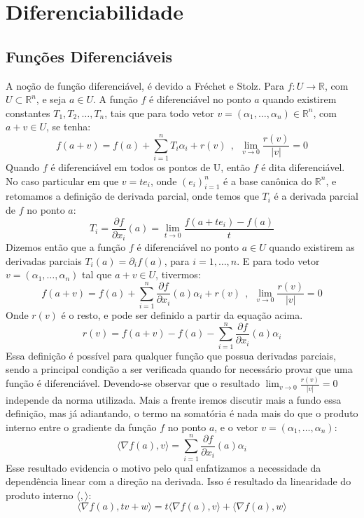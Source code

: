 \section{Diferenciabilidade}


\subsection{Funções Diferenciáveis} 

A noção de função diferenciável, é devido a Fréchet e Stolz. 
Para $f:U\to\mathbb{R}$, com $U \subset \mathbb{R}^n$, e seja $a\in U$. A função $f$ é diferenciável no ponto $a$ quando existirem constantes $T_1, T_2,\ldots,T_n$, tais que para todo vetor $v = (\alpha_1,\ldots,\alpha_n) \in \mathbb{R}^n$, com $a+v\in U$, se tenha:
%
\[
f(a+v) = f(a) + \sum_{i=1}^{n}T_i\alpha_i + r(v) 
\ \ , \ \ 
\lim_{v\to 0} \frac{r(v)}{|v|} = 0
\]
%
Quando $f$ é diferenciável em todos os pontos de U, então $f$ é dita diferenciável. No caso particular em que $v = t e_i$, onde 
$(e_i)_{i=1}^{n}$ é a base canônica do $\mathbb{R}^n$, e retomamos 
a definição de derivada parcial, onde temos que $T_i$ é a derivada 
parcial de $f$ no ponto $a$:
%
\[
T_i = \frac{\partial f}{\partial x_i}(a) 
= \lim_{t \to 0} \frac{f(a + te_i) - f(a)}{t}
\]
%
Dizemos então que a função $f$ é diferenciável no ponto $a \in U$ 
quando existirem as derivadas parciais $T_i(a) = \partial_{i}f(a)$, 
para $i=1,\ldots,n$. E para todo vetor $v = (\alpha_1,\ldots,\alpha_n)$ tal que $a+v\in U$, tivermos:
%
\[
f(a+v) = f(a) + \sum_{i=1}^{n}\frac{\partial f}{\partial x_i}(a)
\alpha_i + r(v) 
\ \ , \ \ 
\lim_{v\to 0} \frac{r(v)}{|v|} = 0
\]
%
Onde $r(v)$ é o resto, e pode ser definido a partir da equação acima. 
%
\[
r(v) = f(a+v) - f(a) 
- \sum_{i=1}^{n}\frac{\partial f}{\partial x_i}(a)\alpha_i
\]
%
Essa definição é possível para qualquer função que possua derivadas parciais, sendo a principal condição a ser verificada quando for necessário provar que uma função é diferenciável. Devendo-se observar que o resultado $\lim_{v\to 0} \frac{r(v)}{|v|} = 0$ independe da norma utilizada. Mais a frente iremos discutir mais a fundo essa definição, mas já adiantando, o termo na somatória é nada mais do que o produto interno entre o gradiente da função $f$ no ponto $a$, e o vetor $v = (\alpha_1,\ldots,\alpha_n)$:
%
\[
\langle \nabla f(a) , v \rangle 
= \sum_{i=1}^{n}\frac{\partial f}{\partial x_i}(a)\alpha_i
\]
%
Esse resultado evidencia o motivo pelo qual enfatizamos a necessidade da dependência linear com a direção na derivada. Isso é resultado da linearidade do produto interno $\langle , \rangle$:
%
\[
\langle \nabla f(a) , tv + w \rangle 
= t \langle \nabla f(a) , v \rangle + \langle \nabla f(a) , w \rangle
\]



